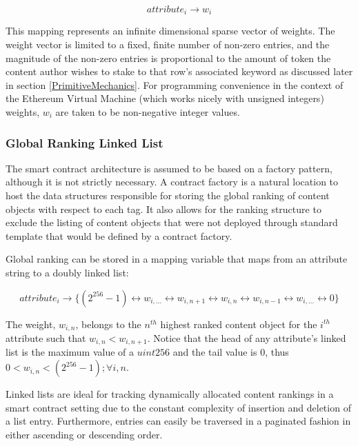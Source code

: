 \begin{equation}
    attribute_i \rightarrow w_i
\end{equation}

This mapping represents an infinite dimensional sparse vector of weights. The weight vector is limited to a fixed, finite number of non-zero entries, and the magnitude of the non-zero entries is proportional to the amount of token the content author wishes to stake to that row’s associated keyword as discussed later in section \ref{PrimitiveMechanics}. For programming convenience in the context of the Ethereum Virtual Machine \cite{wood2014ethereum} (which works nicely with unsigned integers) weights, $w_i$ are taken to be non-negative integer values. 

\subsubsection{Global Ranking Linked List}


The smart contract architecture is assumed to be based on a factory pattern, although it is not strictly necessary. A contract factory is a natural location to host the data structures responsible for storing the global ranking of content objects with respect to each tag. It also allows for the ranking structure to exclude the listing of content objects that were not deployed through standard template that would be defined by a contract factory. 

Global ranking can be stored in a mapping variable that maps from an attribute string to a doubly linked list:

\begin{equation}
    attribute_i \rightarrow \{(2^{256}-1) \leftrightarrow w_{i,...} \leftrightarrow w_{i,n+1} \leftrightarrow w_{i,n} \leftrightarrow w_{i,n-1} \leftrightarrow w_{i,...} \leftrightarrow 0\}
\end{equation}

The weight, $w_{i,n}$, belongs to the $n^{th}$ highest ranked content object for the $i^{th}$ attribute such that $w_{i,n} < w_{i,n+1}$. Notice that the head of any attribute's linked list is the maximum value of a $uint256$ and the tail value is $0$, thus $0 < w_{i,n} < (2^{256}-1); \forall i,n$. 

Linked lists are ideal for tracking dynamically allocated content rankings in a smart contract setting due to the constant complexity of insertion and deletion of a list entry. Furthermore, entries can easily be traversed in a paginated fashion in either ascending or descending order. 

